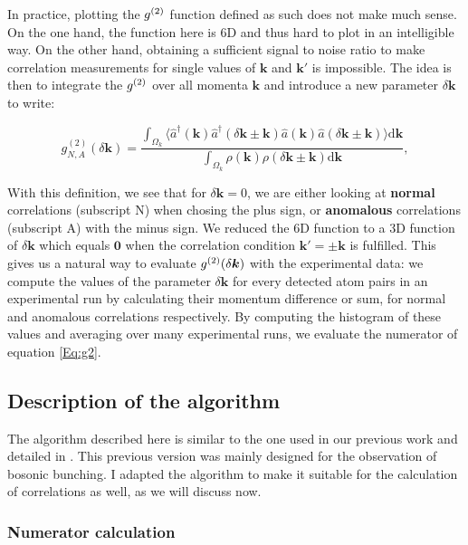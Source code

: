 In practice, plotting the $g^{(2)}$ function defined as such does not make much sense. On the one hand, the function here is 6D and thus hard to plot in an intelligible way. On the other hand, obtaining a sufficient signal to noise ratio to make correlation measurements for single values of $\bm{k}$ and $\bm{k'}$ is impossible. The idea is then to integrate the $g^{(2)}$ over all momenta $\bm{k}$ and introduce a new parameter $\delta \bm{k}$ to write:

\begin{equation}
    g_{N,A}^{(2)} (\delta {\bm k})=\frac{\int_{\Omega_{k}} \langle \hat{a}^{\dagger}({\bm k}) \hat{a}^{\dagger}(\delta {\bm k} \pm {\bm k}) \hat{a}({\bm k}) \hat{a}(\delta {\bm k} \pm {\bm k}) \rangle \mathrm{d}{\bm k}}{\int_{\Omega_{k}} \rho({\bm k}) \rho(\delta {\bm k} \pm {\bm k}) \mathrm{d}\bm{k}},
    \label{Eq:g2}
\end{equation}

With this definition, we see that for $\delta \bm{k}=0$, we are either looking at \textbf{normal} \kk correlations (subscript N) when chosing the plus sign, or \textbf{anomalous} \kmk correlations (subscript A) with the minus sign. We reduced the 6D function to a 3D function of $\delta \bm{k}$ which equals $\bm{0}$ when the correlation condition $\bm{k'} = \pm \bm{k}$ is fulfilled. This gives us a natural way to evaluate $g^{(2)} (\delta \bm{k})$ with the experimental data: we compute the values of the parameter $\delta \bm{k}$ for every detected atom pairs in an experimental run by calculating their momentum difference or sum, for normal and anomalous correlations respectively. By computing the histogram of these values and averaging over many experimental runs, we evaluate the numerator of equation \ref{Eq:g2}.

\subsection{Description of the algorithm}

The algorithm described here is similar to the one used in our previous work \cite{carcy2019momentum,cayla2020} and detailed in \cite{cayla_these,carcy_these}. This previous version was mainly designed for the observation of bosonic bunching. I adapted the algorithm to make it suitable for the calculation of \kmk correlations as well, as we will discuss now.

\subsubsection{Numerator calculation}


